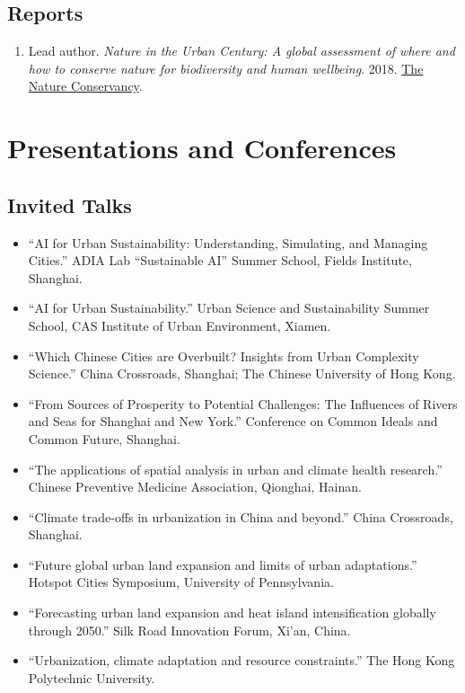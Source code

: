 \documentclass[11pt,letterpaper]{article}
\begin{document}
\subsection{Reports}
\begin{enumerate}
  \item Lead author. \textit{Nature in the Urban Century: A global assessment of where and how to conserve nature for biodiversity and human wellbeing}. 2018. \href{https://www.nature.org/en-us/what-we-do/our-insights/perspectives/nature-in-the-urban-century/}{The Nature Conservancy}.
\end{enumerate}

\section{Presentations and Conferences}

\subsection{Invited Talks}
\begin{itemize}
  \item[2025] ``AI for Urban Sustainability: Understanding, Simulating, and Managing Cities.'' ADIA Lab ``Sustainable AI'' Summer School, Fields Institute, Shanghai.
  \item[2025] ``AI for Urban Sustainability.'' Urban Science and Sustainability Summer School, CAS Institute of Urban Environment, Xiamen.
  \item[2024] ``Which Chinese Cities are Overbuilt? Insights from Urban Complexity Science.'' China Crossroads, Shanghai; The Chinese University of Hong Kong.
  \item[2024] ``From Sources of Prosperity to Potential Challenges: The Influences of Rivers and Seas for Shanghai and New York.'' Conference on Common Ideals and Common Future, Shanghai.
  \item[2023] ``The applications of spatial analysis in urban and climate health research.'' Chinese Preventive Medicine Association, Qionghai, Hainan.
  \item[2023] ``Climate trade-offs in urbanization in China and beyond.'' China Crossroads, Shanghai.
  \item[2019] ``Future global urban land expansion and limits of urban adaptations.'' Hotspot Cities Symposium, University of Pennsylvania.
  \item[2017] ``Forecasting urban land expansion and heat island intensification globally through 2050.'' Silk Road Innovation Forum, Xi'an, China.
  \item[2017] ``Urbanization, climate adaptation and resource constraints.'' The Hong Kong Polytechnic University.
\end{itemize}
\end{document}

